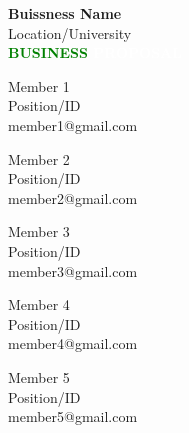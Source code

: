 \documentclass[11pt]{article}
\begin{document}
\begin{titlepage}
	\vspace*{\fill} %
	\begin{center}
		\textbf{\huge {Buissness Name}} \\ %
		\vspace{0.5cm}
		\large Location/University \\
		\vspace{2cm}
		\textbf{\Huge \textcolor{green}{BUSINESS} \textcolor{white}{PROPOSAL}} \\
		\vspace{2cm}
		\begin{minipage}[t]{0.3\textwidth}
			\begin{flushleft}
				Member 1 \\
				Position/ID \\
				member1@gmail.com
			\end{flushleft}
		\end{minipage}
		\begin{minipage}[t]{0.3\textwidth}
			\begin{center}
				Member 2 \\
				Position/ID \\
				member2@gmail.com
			\end{center}
		\end{minipage}
		\begin{minipage}[t]{0.3\textwidth}
			\begin{flushright}
				Member 3 \\
				Position/ID \\
				member3@gmail.com
			\end{flushright}
		\end{minipage}

		\vspace{1cm} %

		\begin{minipage}[t]{0.3\textwidth}
			\begin{flushleft}
				Member 4 \\
				Position/ID \\
				member4@gmail.com
			\end{flushleft}
		\end{minipage}
		\begin{minipage}[t]{0.3\textwidth}
			\begin{flushright}
				Member 5 \\
				Position/ID \\
				member5@gmail.com
			\end{flushright}
		\end{minipage}
	\end{center}
	\vspace*{\fill} %
\end{titlepage}
\end{document}

